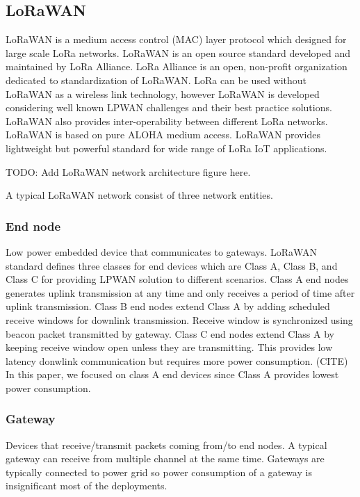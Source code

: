 \documentclass[conference]{IEEEtran}
\begin{document}
\subsection{LoRaWAN}
\par LoRaWAN is a medium access control (MAC) layer protocol which designed for large scale LoRa networks. LoRaWAN is an open source standard developed and maintained by LoRa Alliance. LoRa Alliance is an open, non-profit organization dedicated to standardization of LoRaWAN. LoRa can be used without LoRaWAN as a wireless link technology, however LoRaWAN is developed considering well known LPWAN challenges and their best practice solutions. LoRaWAN also provides inter-operability between different LoRa networks. LoRaWAN is based on pure ALOHA medium access. LoRaWAN provides lightweight but powerful standard for wide range of LoRa IoT applications.

\par TODO: Add LoRaWAN network architecture figure here.

\par A typical LoRaWAN network consist of three network entities.
\subsubsection{End node}
Low power embedded device that communicates to gateways. LoRaWAN standard defines three classes for end devices which are Class A, Class B, and Class C for providing LPWAN solution to different scenarios. Class A end nodes generates uplink transmission at any time and only receives a period of time after uplink transmission. Class B end nodes extend Class A by adding scheduled receive windows for downlink transmission. Receive window is synchronized using beacon packet transmitted by gateway. Class C end nodes extend Class A by keeping receive window open unless they are transmitting. This provides low latency donwlink communication but requires more power consumption. (CITE) In this paper, we focused on class A end devices since Class A provides lowest power consumption.

\subsubsection{Gateway}
Devices that receive/transmit packets coming from/to end nodes. A typical gateway can receive from multiple channel at the same time. Gateways are typically connected to power grid so power consumption of a gateway is insignificant most of the deployments.
\end{document}
